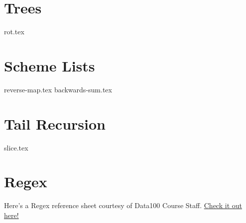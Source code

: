 \documentclass{exam}
\begin{document}
\section{Trees}
\begin{questions}
{rot.tex}
\end{questions}

\section{Scheme Lists}
\begin{questions}
{reverse-map.tex}
{backwards-sum.tex}
\end{questions}

\section{Tail Recursion}
\begin{questions}
{slice.tex}
\end{questions}

\section{Regex}
Here's a Regex reference sheet courtesy of Data100 Course Staff. \href{https://drive.google.com/file/d/1lhIy1fIJZKXeIZYGv4ltkFMwq0OxdKNn/view?usp=sharing}{Check it out here!}
\end{document}
